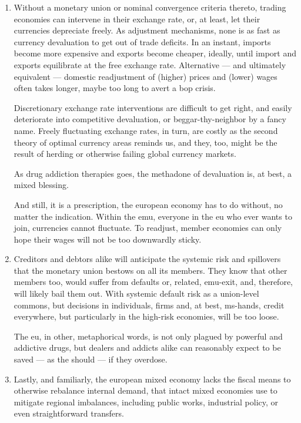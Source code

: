 \begin{enumerate}
	\item Without a monetary union or nominal convergence criteria thereto, trading economies can intervene in their exchange rate, or, at least, let their currencies depreciate freely.
	As adjustment mechanisms, none is as fast as currency devaluation to get out of trade deficits.
	In an instant, imports become more expensive and exports become cheaper, ideally, until import and exports equilibrate at the free exchange rate.
	Alternative --- and ultimately equivalent --- domestic readjustment of (higher) prices and (lower) wages often takes longer, maybe too long to avert a \gls{bop} crisis.

	Discretionary exchange rate interventions are difficult to get right, and easily deteriorate into competitive devaluation, or beggar-thy-neighbor by a fancy name.
	Freely fluctuating exchange rates, in turn, are costly as the second theory of optimal currency areas reminds us, %
	and they, too, might be the result of herding or otherwise failing global currency markets.

	As drug addiction therapies goes, the methadone of devaluation is, at best, a mixed blessing.

	And still, it is a prescription, the european economy has to do without, no matter the indication.
	Within the \gls{emu}, everyone in the \gls{eu} who ever wants to join, currencies cannot fluctuate.
	To readjust, member economies can only hope their wages will not be too downwardly sticky.

	\item Creditors and debtors alike will anticipate the systemic risk and spillovers that the monetary union bestows on all its members.
	They know that other members too, would suffer from defaults or, related, \gls{emu}-exit, and, therefore, will likely bail them out.
	With systemic default risk as a union-level commons, but decisions in individuals, firms and, at best, \gls{ms}-hands, credit everywhere, but particularly in the high-risk economies, will be too loose.

	The \gls{eu}, in other, metaphorical words, is not only plagued by powerful and addictive drugs, but dealers and addicts alike can reasonably expect to be saved --- as the should --- if they overdose.

	\item Lastly, and familiarly, the european mixed economy lacks the fiscal means to otherwise rebalance internal demand, that intact mixed economies use to mitigate regional imbalances, including public works, industrial policy, or even straightforward transfers.
\end{enumerate}

